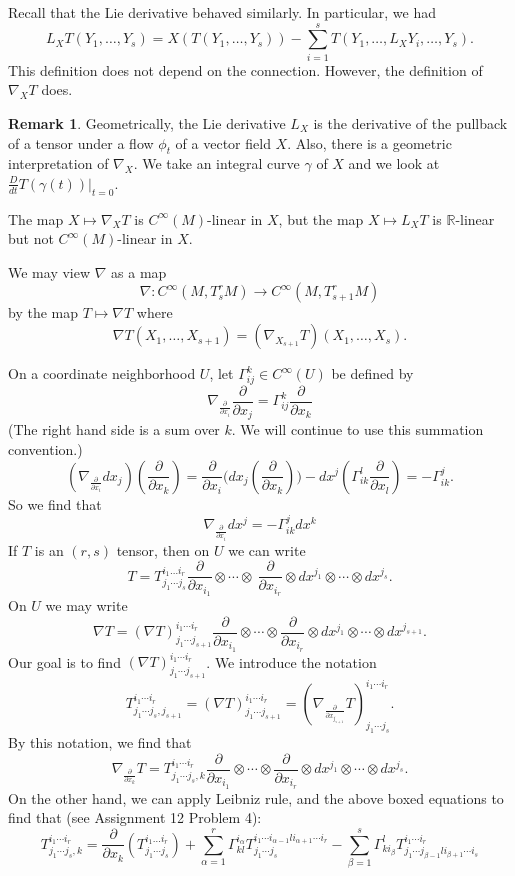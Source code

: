 \documentclass{amsart}
\numberwithin{equation}{section}
\theoremstyle{definition}
\newtheorem{remark}[definition]{Remark}
\theoremstyle{theorem}
\begin{document}
Recall that the Lie derivative behaved similarly. In particular, we had 
\[
L_XT(Y_1, \ldots, Y_s) = X(T(Y_1, \ldots, Y_s)) - \sum_{i=1}^s T(Y_1, \ldots, L_XY_i, \ldots, Y_s). 
\]
This definition does not depend on the connection. However, the definition of $\nabla_XT$ does. 

\begin{remark}
Geometrically, the Lie derivative $L_X$ is the derivative of the pullback of a tensor under a flow $\phi_t$ of a vector field $X$. Also, there is a geometric interpretation of $\nabla_X$. We take an integral curve $\gamma$ of $X$ and we look at $\frac{D}{dt}T(\gamma(t))|_{t=0}$. 

The map $X \mapsto \nabla_XT$ is $C^\infty(M)$-linear in $X$, but the map $X \mapsto L_XT$ is $\mathbb{R}$-linear but not $C^\infty(M)$-linear in $X$. 

We may view $\nabla$ as a map 
\[
\nabla : C^{\infty}(M, T_s^r M) \to C^\infty(M, T_{s+1}^rM)
\]
by the map $T \mapsto \nabla T$ where 
\[
\nabla T(X_1, \ldots, X_{s+1}) = (\nabla_{X_{s+1}}T)(X_1, \ldots, X_s).
\]
\end{remark}


On a coordinate neighborhood $U$, let $\Gamma_{ij}^k\in C^\infty(U)$ be defined by 
\[
\boxed{\nabla_{\frac{\partial}{\partial x_i}}\frac{\partial}{\partial x_j} = \Gamma_{ij}^k \frac{\partial}{\partial x_k} }
\]
(The right hand side is a sum over $k$. We will continue to use this summation convention.) 
\[
(\nabla_{\frac{\partial}{\partial x_i}}dx_j)(\frac{\partial}{\partial x_k}) =
\frac{\partial}{\partial x_i}\Big(dx_j(\frac{\partial}{\partial x_k})\Big) 
- dx^j\left(\Gamma_{ik}^l \frac{\partial}{\partial x_l} \right) = - \Gamma_{ik}^j.
\]
So we find that 
\[
\boxed{\nabla_{\frac{\partial}{\partial x_i} }dx^j = -\Gamma_{ik}^j dx^k}
\]
If $T$ is an $(r,s)$ tensor, then on $U$ we can write 
\[
T = T^{i_1 \ldots i_r}_{j_1 \cdots j_s} \frac{\partial}{\partial x_{i_1}} \otimes \cdots \otimes \
\frac{\partial}{\partial x_{i_r}} \otimes dx^{j_1} \otimes \cdots \otimes dx^{j_s}.
\]
On $U$ we may write 
\[
\nabla T  =(\nabla T)_{j_1 \cdots j_{s+1}}^{i_1 \cdots i_r} \frac{\partial}{\partial x_{i_1}} \otimes \cdots \otimes 
\frac{\partial}{\partial x_{i_r}} \otimes dx^{j_1} \otimes \cdots \otimes dx^{j_{s+1}}.
\]
Our goal is to find $(\nabla T)_{j_1 \cdots j_{s+1}}^{i_1 \cdots i_r}$. We introduce the notation 
\[
T_{j_1 \cdots j_s, j_{s+1}}^{i_1 \cdots i_r} = (\nabla T)_{j_1 \cdots j_{s+1}}^{i_1 \cdots i_r} = 
(\nabla_{\frac{\partial}{\partial x_{j_{s+1}}}}T)^{i_1 \cdots i_r}_{j_1 \cdots j_s}.
\]
By this notation, we find that  
\[
\nabla_{\frac{\partial}{\partial x_k} }T = T_{j_1 \cdots j_s, k}^{i_1 \cdots i_r}
\frac{\partial}{\partial x_{i_1}} \otimes \cdots \otimes \frac{\partial}{\partial x_{i_r}} \otimes dx^{j_1} \otimes \cdots \otimes dx^{j_s}.
\]
On the other hand, we can apply Leibniz rule, and the above boxed equations to find that (see Assignment 12 Problem 4): 
\[
\boxed{T_{j_1 \cdots j_s, k}^{i_1 \cdots i_r} = \frac{\partial}{\partial x_k}(T^{i_1 \ldots i_r}_{j_1 \cdots j_s}) + \sum_{\alpha = 1}^r \Gamma_{kl}^{i_\alpha} T_{j_1 \cdots j_s}^{i_1 \cdots i_{\alpha - 1} l i_{\alpha + 1} \cdots i_r} - \sum_{\beta = 1}^s \Gamma_{k i_\beta}^{l}T_{j_1 \cdots j_{\beta - 1} l i_{\beta + 1} \cdots i_s }^{i_1 \cdots i_r}}
\]
\end{document}
